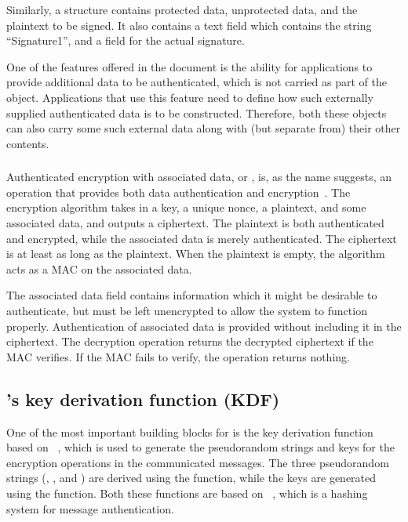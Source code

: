 {Similarly, a \mCoseSign{} structure contains protected data, unprotected data, and the plaintext to be signed. It also contains a text field which contains the string ``Signature1'', and a field for the actual signature.

One of the features offered in the \mCose{} document is the ability for applications to provide additional data to be authenticated, which is not carried as part of the \mCose{} object. Applications that use this feature need to define how such externally supplied authenticated data is to be constructed. Therefore, both these objects can also carry some such external data along with (but separate from) their other contents.

\subsubsection{\mAead{}}
Authenticated encryption with associated data, or \mAead{}, {is, as the name suggests, an operation that provides
both data authentication and encryption}~\cite{aead}. The {encryption} algorithm takes in a
key, a unique nonce, a plaintext, and some associated data, and outputs a
ciphertext. The plaintext is both authenticated and encrypted, while the
associated data is merely authenticated. The ciphertext is at least as long as
the plaintext. When the plaintext is empty, the \mAead{} 
algorithm acts as a MAC on the associated data.

The associated data {field contains} information {which it might be desirable to authenticate, but} must be left unencrypted to allow the system to function properly.
Authentication {of associated data} is provided without {including it in the ciphertext.} {The \mAead{} decryption operation returns the decrypted ciphertext if   the MAC verifies. If the MAC fails to verify, the operation returns
nothing.}

\subsection{\mEdhoc's key derivation function (KDF)}
One of the most important building blocks for \mEdhoc{} is the key derivation function based on \mHkdf~\cite{rfc5869}, which is used to generate the pseudorandom strings and keys for the encryption operations in the communicated messages. The three pseudorandom strings (\mPRKtwo, \mPRKthree, and \mPRKfour) are derived using the \mHkdfExtract{} function, while the keys  are generated using the \mHkdfExpand{} function. Both these functions are based on \mHmac~\cite{rfc2104}, which is a hashing system for message authentication.

}
